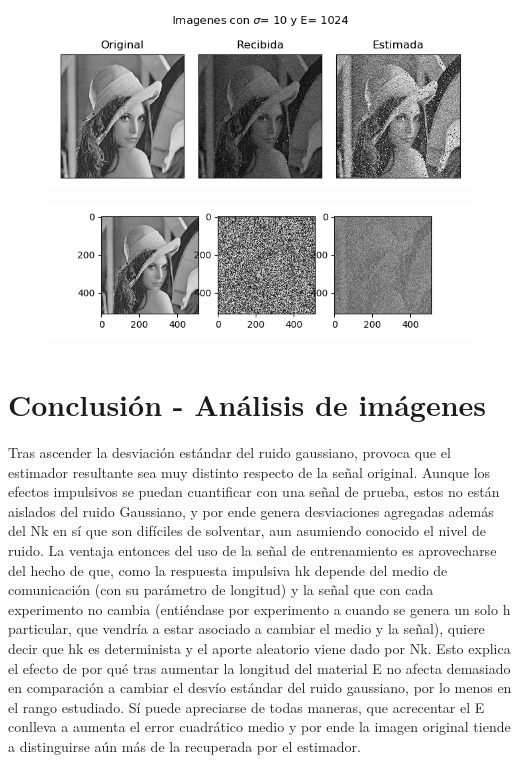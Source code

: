 \begin{figure}[H]
\includegraphics[scale=1]{Imagenes/E1024S10}
\centering
\end{figure}

\begin{figure}[H]
\includegraphics[scale=1]{Imagenes/E1024S100}
\centering
\end{figure}


\section{Conclusi\'on - An\'alisis de im\'agenes}
Tras ascender la desviaci\'on est\'andar del ruido gaussiano, provoca que el estimador resultante sea muy distinto respecto de la se\~nal original. Aunque los efectos impulsivos se puedan cuantificar con una se\~nal de prueba, estos no est\'an aislados del ruido Gaussiano, y por ende genera desviaciones agregadas adem\'as del Nk en s\'i que son dif\'iciles de solventar, aun asumiendo conocido el nivel de ruido. La ventaja entonces del uso de la se\~nal de entrenamiento es aprovecharse del hecho de que, como la respuesta impulsiva hk depende del medio de comunicaci\'on (con su par\'ametro de longitud) y la se\~nal que con cada experimento no cambia (enti\'endase por experimento a cuando se genera un solo h particular, que vendr\'ia a estar asociado a cambiar el medio y la se\~nal), quiere decir que hk es determinista y el aporte aleatorio viene dado por Nk. Esto explica el efecto de por qu\'e tras aumentar la longitud del material E no afecta demasiado en comparaci\'on a cambiar el desv\'io est\'andar del ruido gaussiano, por lo menos en el rango estudiado. Sí puede apreciarse de todas maneras, que acrecentar el E conlleva a aumenta el error cuadr\'atico medio y por ende la imagen original tiende a distinguirse a\'un m\'as de la recuperada por el estimador.

